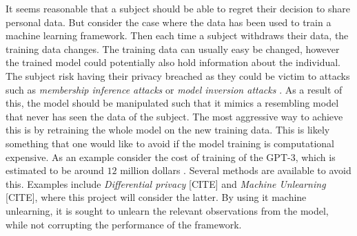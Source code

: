It seems reasonable that a subject should be able to regret their decision to share personal data. But consider the case where the data has been used to train a machine learning framework. Then each time a subject withdraws their data, the training data changes. The training data can usually easy be changed, however the trained model could potentially also hold information about the individual. The subject risk having their privacy breached as they could be victim to attacks such as \textit{membership inference attacks} \cite{shokri_membership_2017} or \textit{model inversion attacks} \cite{fredrikson_model_2015}. As a result of this, the model should be manipulated such that it mimics a resembling model that never has seen the data of the subject. The most aggressive way to achieve this is by retraining the whole model on the new training data. This is likely something that one would like to avoid if the model training is computational expensive. As an example consider the cost of training of the GPT-3, which is estimated to be around $12$ million dollars \cite{wiggers_openais_2020}. Several methods are available to avoid this. Examples include \textit{Differential privacy} [CITE] and \textit{Machine Unlearning} [CITE], where this project will consider the latter. By using it machine unlearning, it is sought to unlearn the relevant observations from the model, while not corrupting the performance of the framework. 













